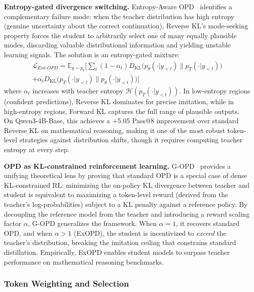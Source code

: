 \documentclass{article} %
\newcommand{\KL}{D_{\mathrm{KL}}}
\newcommand{\ptheta}{p_\theta}
\newcommand{\pteacher}{p_T}
\begin{document}
\textbf{Entropy-gated divergence switching.}
Entropy-Aware OPD~\citep{2603.07079} identifies a complementary failure mode: when the teacher distribution has high entropy (genuine uncertainty about the correct continuation), Reverse KL's mode-seeking property forces the student to arbitrarily select one of many equally plausible modes, discarding valuable distributional information and yielding unstable learning signals. The solution is an entropy-gated mixture:
\begin{equation}
\begin{split}
    \mathcal{L}_{Ent\text{-}OPD} = \mathbb{E}_{y \sim \ptheta} \bigg[ \sum_t (1 - \alpha_t) \KL\big(\ptheta(\cdot|y_{<t}) \parallel \pteacher(\cdot|y_{<t})\big) \\
    + \alpha_t \KL\big(\pteacher(\cdot|y_{<t}) \parallel \ptheta(\cdot|y_{<t})\big) \bigg]
\end{split}
\end{equation}
where $\alpha_t$ increases with teacher entropy $\mathcal{H}(\pteacher(\cdot|y_{<t}))$. In low-entropy regions (confident predictions), Reverse KL dominates for precise imitation, while in high-entropy regions, Forward KL captures the full range of plausible outputs. On Qwen3-4B-Base, this achieves a +5.05 Pass@8 improvement over standard Reverse KL on mathematical reasoning, making it one of the most robust token-level strategies against distribution shifts, though it requires computing teacher entropy at every step.

\textbf{OPD as KL-constrained reinforcement learning.}
G-OPD~\citep{2602.12125} provides a unifying theoretical lens by proving that standard OPD is a special case of dense KL-constrained RL: minimizing the on-policy KL divergence between teacher and student is equivalent to maximizing a token-level reward (derived from the teacher's log-probabilities) subject to a KL penalty against a reference policy. By decoupling the reference model from the teacher and introducing a reward scaling factor $\alpha$, G-OPD generalizes the framework. When $\alpha = 1$, it recovers standard OPD, and when $\alpha > 1$ (ExOPD), the student is incentivized to \emph{exceed} the teacher's distribution, breaking the imitation ceiling that constrains standard distillation. Empirically, ExOPD enables student models to surpass teacher performance on mathematical reasoning benchmarks.

\subsubsection{Token Weighting and Selection}
\end{document}
